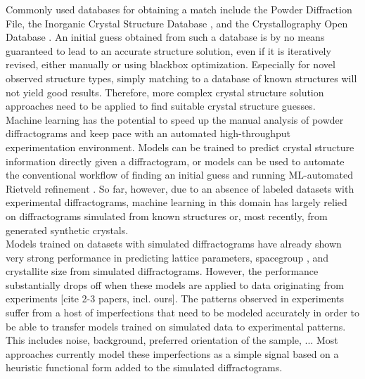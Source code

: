Commonly used databases for obtaining a match include the Powder Diffraction File\cite{GatesRector2019}, the Inorganic Crystal Structure Database \cite{Belsky2002}, and the Crystallography Open Database \cite{Grazulis2009}. An initial guess obtained from such a database is by no means guaranteed to lead to an accurate structure solution, even if it is iteratively revised, either manually or using blackbox optimization\cite{Ozaki2020}. Especially for novel observed structure types, simply matching to a database of known structures will not yield good results. Therefore, more complex crystal structure solution approaches need to be applied to find suitable crystal structure guesses. \\


Machine learning has the potential to speed up the manual analysis of powder diffractograms and keep pace with an automated high-throughput experimentation environment\cite{Agrawal2019, Surdu2023}.
Models can be trained to predict crystal structure information directly given a diffractogram, or models can be used to automate the conventional workflow of finding an initial guess \cite{Surdu2023} and running ML-automated Rietveld refinement \cite{Feng2019}.
So far, however, due to an absence of labeled datasets with experimental diffractograms\cite{Wang2020}, machine learning in this domain has largely relied on diffractograms simulated from known structures\cite{Park2017, Lee2023} or, most recently, from generated synthetic crystals\cite{Schopmans2023}. \\

Models trained on datasets with simulated diffractograms have already shown very strong performance in predicting lattice parameters\cite{Dong2021, Chitturi2021, Habershon2004, zhang2024crystallographic}, spacegroup \cite{Schopmans2023, Oviedo2018, Park2017, Vecsei2018, Zaloga2020, Suzuki2020, Chakraborty2021,zhang2024crystallographic}, and crystallite size \cite{Dong2021, Chakraborty2021} from simulated diffractograms.
However, the performance substantially drops off when these models are applied to data originating from experiments \cite{Schopmans2023,zhang2024crystallographic}[cite 2-3 papers, incl. ours].
The patterns observed in experiments suffer from a host of imperfections that need to be modeled accurately in order to be able to transfer models trained on simulated data to experimental patterns. This includes noise, background, preferred orientation of the sample, ...
Most approaches currently model these imperfections as a simple signal based on a heuristic functional form added to the simulated diffractograms.

